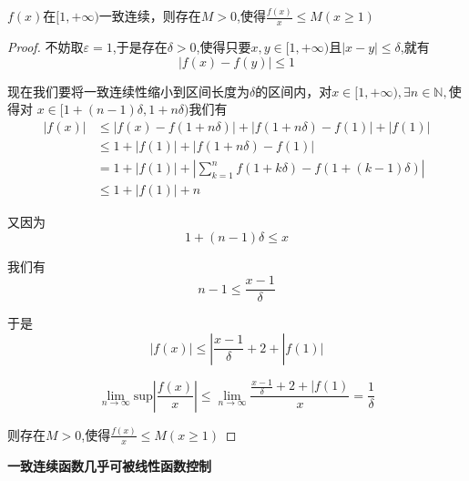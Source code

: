 \documentclass[lang=cn,10pt]{elegantbook}
\begin{document}
	\begin{example}
		$f(x)$在$[1,+\infty)$一致连续，则存在$M>0$,使得$\frac{f(x)}{x}\le M(x\ge1)$
	\end{example}
	\begin{proof}
		不妨取$\varepsilon =1$,于是存在$\delta>0$,使得只要$x,y\in [1,+\infty)$且$|x-y|\le \delta$,就有
		\begin{equation*}
			|f(x)-f(y)|\le1
		\end{equation*}
		
		现在我们要将一致连续性缩小到区间长度为$\delta$的区间内，对$x\in[1,+\infty),\exists n\in \mathbb{N},$使得对
		$x\in [1+(n-1)\delta,1+n\delta)$我们有
	    \begin{equation*}
	    	\begin{aligned}
	    		|f\left( x \right) |&\le |f\left( x \right) -f\left( 1+n\delta \right) |+|f\left( 1+n\delta \right) -f\left( 1 \right) |+|f\left( 1 \right) |
	    		\\
	    		&\le 1+|f\left( 1 \right) |+|f\left( 1+n\delta \right) -f\left( 1 \right) |
	    		\\
	    		&=1+|f\left( 1 \right) |+|\sum_{k=1}^n{f\left( 1+k\delta \right) -f\left( 1+\left( k-1 \right) \delta \right)}|
	    		\\
	    		&\le 1+|f\left( 1 \right) |+n
	    	\end{aligned}
	    \end{equation*}
		
		又因为
		\begin{equation*}
			1+(n-1)\delta \le x
		\end{equation*}
		
		我们有
		\begin{equation*}
			n-1\le \frac{x-1}{\delta}
		\end{equation*}
		
		于是
		\begin{equation*}
			|f(x)|\le| \frac{x-1}{\delta}+2+|f(1)|
		\end{equation*}
		
		\begin{equation*}
			\lim_{n\rightarrow \infty} \mathrm{sup}|\frac{f\left( x \right)}{x}|\le \lim_{n\rightarrow \infty} \frac{\frac{x-1}{\delta}+2+|f(1)}{x}=\frac{1}{\delta}
		\end{equation*}
		
		则存在$M>0$,使得$\frac{f(x)}{x}\le M(x\ge1)$
	\end{proof}
	\begin{remark}
		\textbf{一致连续函数几乎可被线性函数控制}
	\end{remark}
\end{document}
